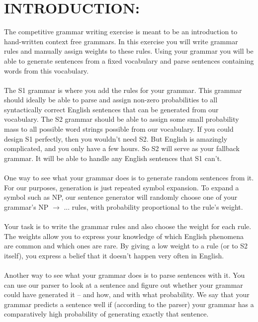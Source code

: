 \documentclass[11pt]{article}
\begin{document}
\section{INTRODUCTION:}
The competitive grammar writing exercise is meant to be an introduction to hand-written context free grammars. In this exercise you will write grammar rules and manually assign weights to these rules. Using your grammar you will be able to generate sentences from a fixed vocabulary and parse sentences containing words from this vocabulary. \\ \\
The S1 grammar is where you add the rules for your grammar. This grammar should ideally be able to parse and assign non-zero probabilities to all syntactically correct English sentences that can be generated from our vocabulary. The S2 grammar should be able to assign some small probability mass to all possible word strings possible from our vocabulary. If you could design S1 perfectly, then you wouldn't need S2. But English is amazingly complicated, and you only have a few hours. So S2 will serve as your fallback grammar. It will be able to handle any English sentences that S1 can't. \\ \\
One way to see what your grammar does is to generate random sentences from it. For our purposes, generation is just repeated symbol expansion. To expand a symbol such as NP, our sentence generator will randomly choose one of your grammar's NP \begin{math} \rightarrow \end{math} ... rules, with probability proportional to the rule's weight.\\ \\
Your task is to write the grammar rules and also choose the weight for each rule. The weights allow you to express your knowledge of which English phenomena are common and which ones are rare. By giving a low weight to a rule (or to S2 itself), you express a belief that it doesn't happen very often in English. \\ \\
Another way to see what your grammar does is to parse sentences with it. You can use our parser to look at a sentence and figure out whether your grammar could have generated it -- and how, and with what probability. We say that your grammar predicts a sentence well if (according to the parser) your grammar has a comparatively high probability of generating exactly that sentence. \\ \\
\end{document}
